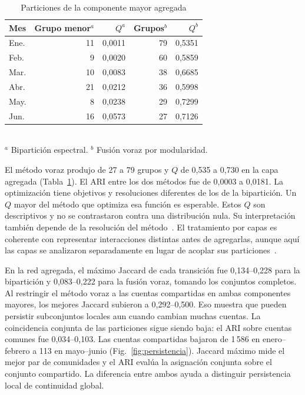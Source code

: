 \documentclass[journal]{IEEEtran}
\begin{document}
\begin{table}[t]
\centering
\caption{Particiones de la componente mayor agregada}
\label{tab:particiones}
\begin{tabular}{lrrrr}
\toprule
Mes & Grupo menor$^a$ & $Q^a$ & Grupos$^b$ & $Q^b$\\
\midrule
Ene. & 11 & 0,0011 & 79 & 0,5351\\
Feb. & 9 & 0,0020 & 60 & 0,5859\\
Mar. & 10 & 0,0083 & 38 & 0,6685\\
Abr. & 21 & 0,0212 & 36 & 0,5998\\
May. & 8 & 0,0238 & 29 & 0,7299\\
Jun. & 16 & 0,0573 & 27 & 0,7126\\
\bottomrule
\end{tabular}\\
\footnotesize $^a$ Bipartición espectral. $^b$ Fusión voraz por modularidad.
\end{table}

El método voraz produjo de 27 a 79 grupos y $Q$ de 0,535 a 0,730 en la capa agregada (Tabla~\ref{tab:particiones}). El ARI entre los dos métodos fue de 0,0003 a 0,0181. La optimización tiene objetivos y resoluciones diferentes de los de la bipartición. Un $Q$ mayor del método que optimiza esa función es esperable. Estos $Q$ son descriptivos y no se contrastaron contra una distribución nula. Su interpretación también depende de la resolución del método~\cite{fortunato}. El tratamiento por capas es coherente con representar interacciones distintas antes de agregarlas, aunque aquí las capas se analizaron separadamente en lugar de acoplar sus particiones~\cite{mucha}.

En la red agregada, el máximo Jaccard de cada transición fue 0,134--0,228 para la bipartición y 0,083--0,222 para la fusión voraz, tomando los conjuntos completos. Al restringir el método voraz a las cuentas compartidas en ambas componentes mayores, los mejores Jaccard subieron a 0,292--0,500. Eso muestra que pueden persistir subconjuntos locales aun cuando cambian muchas cuentas. La coincidencia conjunta de las particiones sigue siendo baja: el ARI sobre cuentas comunes fue 0,034--0,103. Las cuentas compartidas bajaron de 1\,586 en enero--febrero a 113 en mayo--junio (Fig.~\ref{fig:persistencia}). Jaccard máximo mide el mejor par de comunidades y el ARI evalúa la asignación conjunta sobre el conjunto compartido. La diferencia entre ambos ayuda a distinguir persistencia local de continuidad global.
\end{document}
